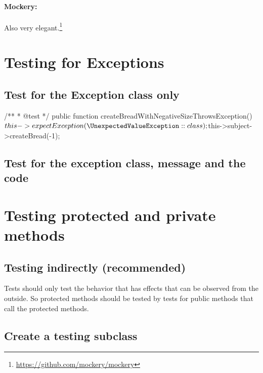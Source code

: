 \documentclass[a4paper,11pt,headsepline]{scrartcl}
\begin{document}
\paragraph{Mockery:} Also very elegant.\footnote{\url{https://github.com/mockery/mockery}}


\pagebreak
\section{Testing for Exceptions}

\subsection{Test for the Exception class only}
\begin{phpcode}
/**
 * @test
 */
public function createBreadWithNegativeSizeThrowsException()
{
    $this->expectException(\UnexpectedValueException::class);

    $this->subject->createBread(-1);
}
\end{phpcode}

\subsection{Test for the exception class, message and the code}


\section{Testing protected and private methods}

\subsection{Testing indirectly (recommended)}

Tests should only test the behavior that has effects that can be observed from the outside. So protected methods should be tested by tests for public methods that call the protected methods.

\subsection{Create a testing subclass}
\end{document}
